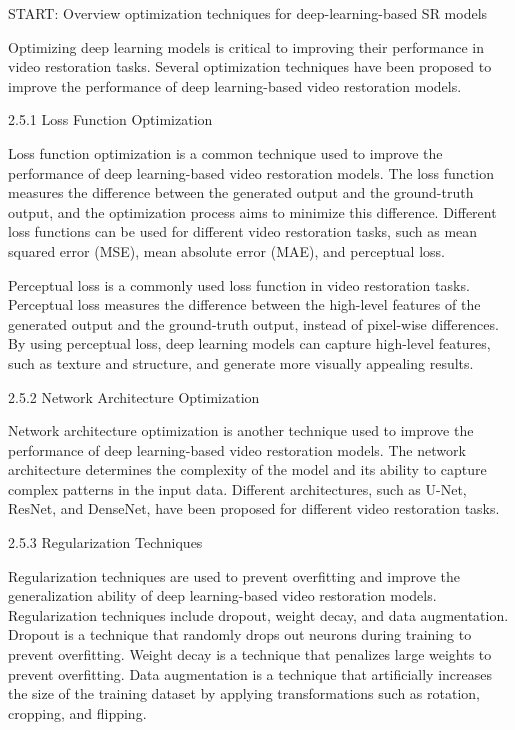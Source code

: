 \label{chap:Optimization}

START: Overview optimization techniques for deep-learning-based SR models

Optimizing deep learning models is critical to improving their performance in video restoration tasks. Several optimization techniques have been proposed to improve the performance of deep learning-based video restoration models.

2.5.1 Loss Function Optimization

Loss function optimization is a common technique used to improve the performance of deep learning-based video restoration models. The loss function measures the difference between the generated output and the ground-truth output, and the optimization process aims to minimize this difference. Different loss functions can be used for different video restoration tasks, such as mean squared error (MSE), mean absolute error (MAE), and perceptual loss.

Perceptual loss is a commonly used loss function in video restoration tasks. Perceptual loss measures the difference between the high-level features of the generated output and the ground-truth output, instead of pixel-wise differences. By using perceptual loss, deep learning models can capture high-level features, such as texture and structure, and generate more visually appealing results.

2.5.2 Network Architecture Optimization

Network architecture optimization is another technique used to improve the performance of deep learning-based video restoration models. The network architecture determines the complexity of the model and its ability to capture complex patterns in the input data. Different architectures, such as U-Net, ResNet, and DenseNet, have been proposed for different video restoration tasks.

2.5.3 Regularization Techniques

Regularization techniques are used to prevent overfitting and improve the generalization ability of deep learning-based video restoration models. Regularization techniques include dropout, weight decay, and data augmentation. Dropout is a technique that randomly drops out neurons during training to prevent overfitting. Weight decay is a technique that penalizes large weights to prevent overfitting. Data augmentation is a technique that artificially increases the size of the training dataset by applying transformations such as rotation, cropping, and flipping.

